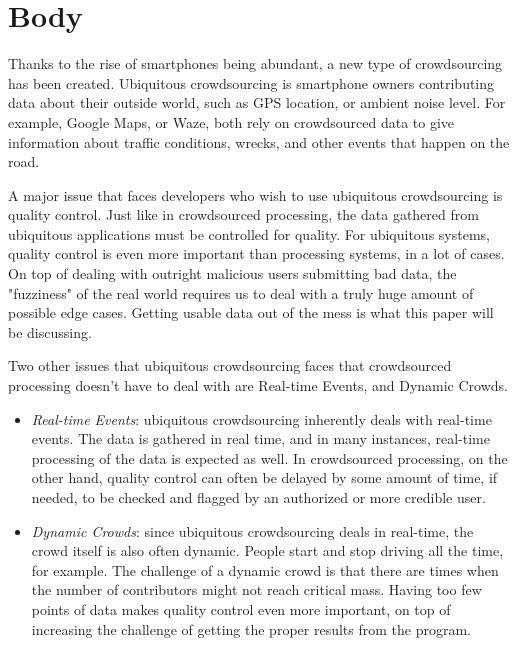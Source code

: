 \documentclass[12pt,twocolumn]{article}
\begin{document}
	\section*{Body}
	    Thanks to the rise of smartphones being abundant, a new type of crowdsourcing has been created. Ubiquitous crowdsourcing is smartphone owners contributing data about their outside world, such as GPS location, or ambient noise level. For example, Google Maps, or Waze, both rely on crowdsourced data to give information about traffic conditions, wrecks, and other events that happen on the road. 
	    
	    A major issue that faces developers who wish to use ubiquitous crowdsourcing is quality control. Just like in crowdsourced processing, the data gathered from ubiquitous applications must be controlled for quality. For ubiquitous systems, quality control is even more important than processing systems, in a lot of cases. On top of dealing with outright malicious users submitting bad data, the "fuzziness" of the real world requires us to deal with a truly huge amount of possible edge cases. Getting usable data out of the mess is what this paper will be discussing.
	    
	    Two other issues that ubiquitous crowdsourcing faces that crowdsourced processing doesn't have to deal with are Real-time Events, and Dynamic Crowds.
	    \begin{itemize}
	        \item \emph{Real-time Events}: ubiquitous crowdsourcing inherently deals with real-time events. The data is gathered in real time, and in many instances, real-time processing of the data is expected as well. %
	        In crowdsourced processing, on the other hand, quality control can often be delayed by some amount of time, if needed, to be checked and flagged by an authorized or more credible user. 
	        
	        
	        \item \emph{Dynamic Crowds}: since ubiquitous crowdsourcing deals in real-time, the crowd itself is also often dynamic. People start and stop driving all the time, for example. The challenge of a dynamic crowd is that there are times when the number of contributors might not reach critical mass. Having too few points of data makes quality control even more important, on top of increasing the challenge of getting the proper results from the program.
	    \end{itemize}
	    
\end{document}
